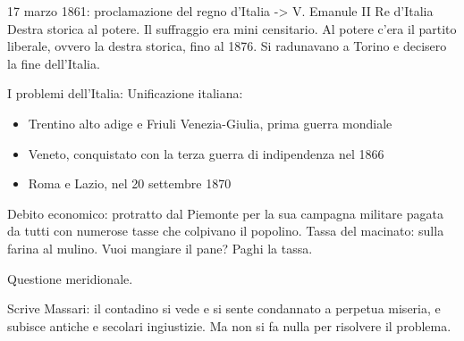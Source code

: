\documentclass{article}
\begin{document}
    17 marzo 1861: proclamazione del regno d'Italia -> V. Emanule II Re d'Italia
    Destra storica al potere. Il suffraggio era mini censitario. Al potere c'era il partito liberale, ovvero la destra storica, fino al 1876. Si radunavano a Torino e decisero la fine dell'Italia.

    I problemi dell'Italia:
    Unificazione italiana:

    \begin{itemize}
        \item Trentino alto adige e Friuli Venezia-Giulia, prima guerra mondiale
        \item Veneto, conquistato con la terza guerra di indipendenza nel 1866
        \item Roma e Lazio, nel 20 settembre 1870
    \end{itemize}

    Debito economico: protratto dal Piemonte per la sua campagna militare pagata da tutti con numerose tasse che colpivano il popolino. Tassa del macinato: sulla farina al mulino. Vuoi mangiare il pane? Paghi la tassa.

    Questione meridionale.

    Scrive Massari: il contadino si vede e si sente condannato a perpetua miseria, e subisce antiche e secolari ingiustizie. Ma non si fa nulla per risolvere il problema.
\end{document}

